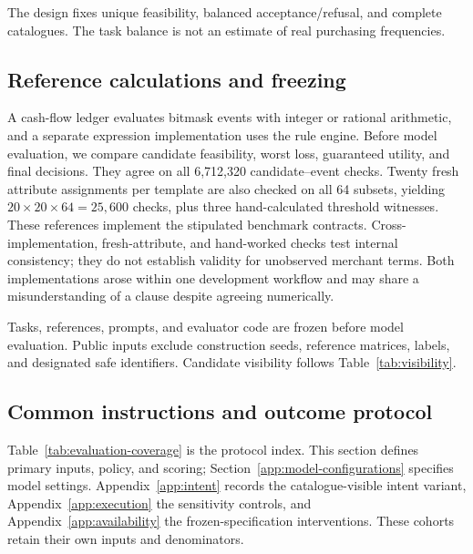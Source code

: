 \documentclass[11pt]{article}
\begin{document}
The design fixes unique feasibility, balanced acceptance/refusal, and complete catalogues. The task balance is not an estimate of real purchasing frequencies.

\subsection{Reference calculations and freezing}
A cash-flow ledger evaluates bitmask events with integer or rational arithmetic, and a separate expression implementation uses the rule engine. Before model evaluation, we compare candidate feasibility, worst loss, guaranteed utility, and final decisions. They agree on all 6,712,320 candidate--event checks. Twenty fresh attribute assignments per template are also checked on all 64 subsets, yielding $20\times20\times64=25{,}600$ checks, plus three hand-calculated threshold witnesses. These references implement the stipulated benchmark contracts. Cross-implementation, fresh-attribute, and hand-worked checks test internal consistency; they do not establish validity for unobserved merchant terms. Both implementations arose within one development workflow and may share a misunderstanding of a clause despite agreeing numerically.

Tasks, references, prompts, and evaluator code are frozen before model evaluation. Public inputs exclude construction seeds, reference matrices, labels, and designated safe identifiers. Candidate visibility follows Table~\ref{tab:visibility}.

\subsection{Common instructions and outcome protocol}
\label{app:implementation}
Table~\ref{tab:evaluation-coverage} is the protocol index. This section defines primary inputs, policy, and scoring; Section~\ref{app:model-configurations} specifies model settings. Appendix~\ref{app:intent} records the catalogue-visible intent variant, Appendix~\ref{app:execution} the sensitivity controls, and Appendix~\ref{app:availability} the frozen-specification interventions. These cohorts retain their own inputs and denominators.
\end{document}
